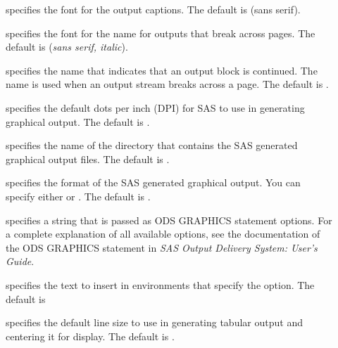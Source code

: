 \documentclass[article,oneside]{memoir}
\begin{document}
    \begin{description}
     \item[] specifies the font for the output captions.
     The default is  (\textsf{sans serif}).

     \item[] specifies the font for the  name
     for outputs that break across pages.
     The default is  (\textsf{\textit{sans serif, italic}}).

     \item[] specifies the name that indicates that an output
     block is continued. The name is used when an output stream breaks across a page.
     The default is .

    \item[] specifies the default dots per inch (DPI) for SAS to use in generating
    graphical output. The default is .

    \item[] specifies the name of the directory that contains the SAS
     generated graphical output files. The default is .

    \item[] specifies the format of the SAS
     generated graphical output. You can specify either
      or . The default is .

    \item[] specifies a string that is passed as
    ODS GRAPHICS statement options. For a complete explanation of all available options,
    see the documentation of the ODS GRAPHICS statement in
    \textit{SAS Output Delivery System: User's Guide}.

    \item[] specifies the text to insert in
     environments that specify
     the  option. The default is 

    \item[] specifies the default line size to use in generating tabular
    output and centering it for display. The default is .


\end{description}
\end{document}
